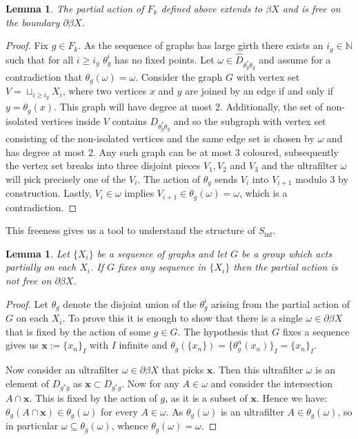 \documentclass[11pt]{amsart}
\theoremstyle{plain}
\newtheorem{lemma}[theorem]{Lemma}%
\theoremstyle{definition}%
\theoremstyle{remark}%
\begin{document}
\begin{lemma}\label{Lem:ParFree}
The partial action of $F_{k}$ defined above extends to $\beta X$ and is free on the boundary $\partial \beta X$.
\end{lemma}
\begin{proof}
Fix $g \in F_{k}$. As the sequence of graphs has large girth there exists an $i_{g} \in \mathbb{N}$ such that for all $i\geq i_{g}$ $\theta_{g}^{i}$ has no fixed points.  Let $\omega \in \widehat{D}_{\theta_{g}^{*}\theta_{g}}$ and assume for a contradiction that $\theta_{g}(\omega)=\omega$. Consider the graph $G$ with vertex set $V=\sqcup_{i\geq i_{g}} X_{i}$, where two vertices $x$ and $y$ are joined by an edge if and only if $y=\theta_{g}(x)$. This graph will have degree at most 2. Additionally, the set of non-isolated vertices inside $V$ contains $D_{\theta_{g}^{*}\theta_{g}}$ and so the subgraph with vertex set consisting of the non-isolated vertices and the same edge set is chosen by $\omega$ and has degree at most 2. Any such graph can be at most $3$ coloured, subsequently the vertex set breaks into three disjoint pieces $V_{1}, V_{2}$ and $V_{3}$ and the ultrafilter $\omega$ will pick precisely one of the $V_{i}$. The action of $\theta_{g}$ sends $V_{i}$ into $V_{i+1}$ modulo $3$ by construction. Lastly, $V_{i} \in \omega$ implies $V_{i+1} \in \theta_{g}(\omega)=\omega$, which is a contradiction.
\end{proof}


This freeness gives us a tool to understand the structure of $S_{\inf}$.

\begin{lemma}\label{Lem:CP}
Let $\lbrace X_{i} \rbrace$ be a sequence of graphs and let $G$ be a group which acts partially on each $X_{i}$. If $G$ fixes any sequence in $\lbrace X_{i} \rbrace$ then the partial action is not free on $\partial \beta X$. 
\end{lemma}
\begin{proof}Let $\theta_{g}$ denote the disjoint union of the $\theta_{g}^{i}$ arising from the partial action of $G$ on each $X_{i}$. To prove this it is enough to show that there is a single $\omega \in\partial\beta X$ that is fixed by the action of some $g \in G$. The hypothesis that $G$ fixes a sequence gives us $\textbf{x}:=\lbrace x_{n} \rbrace_{I}$ with $I$ infinite and $\theta_{g}(\lbrace x_{n} \rbrace) = \lbrace\theta_{g}^{n}(x_{n}) \rbrace_{I} =\lbrace x_{n} \rbrace_{I}$.

Now consider an ultrafilter $\omega \in \partial\beta X$ that picks $\textbf{x}$. Then this ultrafilter $\omega$ is an element of $D_{g^{*}g}$ as $\textbf{x} \subset D_{g^{*}g}$.  Now for any $A \in \omega$ and consider the intersection $A \cap \textbf{x}$. This is fixed by the action of $g$, as it is a subset of $\textbf{x}$. Hence we have: $\theta_{g}(A \cap \textbf{x}) \in \theta_{g}(\omega)$ for every $A \in \omega$. As $\theta_{g}(\omega)$ is an ultrafilter $A \in \theta_{g}(\omega)$, so in particular $\omega \subseteq \theta_{g}(\omega)$, whence $\theta_{g}(\omega)=\omega$. 
\end{proof}
\end{document}

